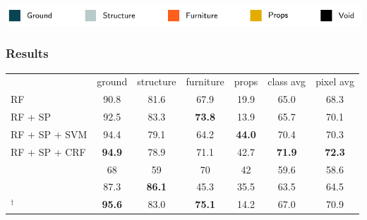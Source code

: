 \documentclass[final,ignorenonframetext,compress]{beamer}
\begin{document}
\begin{frame}
\begin{tabularx}{\linewidth}{@{\extracolsep{\fill}}cccccc}
    \end{tabularx}
    \includegraphics[width=\linewidth]{images/legend.pdf}
\end{frame}

\begin{frame}
    \frametitle{Results}
    \begin{table}[t]
    \begin{tabularx}{\linewidth}{@{\extracolsep{\fill}}lcccccc}
    \toprule
                            & \footnotesize ground        & \footnotesize  structure    & \footnotesize furniture     & \footnotesize props         & \footnotesize class avg   & \footnotesize pixel avg\\
    \cmidrule(r){1-7}

    \footnotesize RF                              &         90.8  &   81.6        & 67.9          & 19.9          &  65.0        &  68.3 \\
    \footnotesize RF + SP                         &         92.5  &   83.3        & \textbf{73.8} & 13.9          &  65.7        &  70.1 \\ 
    \footnotesize RF + SP + SVM                   &         94.4  &   79.1        & 64.2          & \textbf{44.0} &  70.4        &  70.3 \\
    \footnotesize RF + SP + CRF                   & \textbf{94.9} &   78.9        &          71.1 & 42.7          &\textbf{71.9} &  \textbf{72.3} \\
    \cmidrule(r){1-7}
    \footnotesize \citet{SilbermanECCV12}         &         68    &   59          & 70           & 42            &  59.6        & 58.6 \\
    \footnotesize \citet{couprie-iclr-13}         &         87.3  & \textbf{86.1} & 45.3         & 35.5          &  63.5        & 64.5 \\
    \cmidrule(r){1-7}
    \footnotesize \citet{stueckler2013}$^\dagger$ & \textbf{95.6} &   83.0        & \textbf{75.1}& 14.2          &  67.0        & 70.9 \\

    \bottomrule
    \end{tabularx}
    \end{table}
\end{frame}
\end{document}

